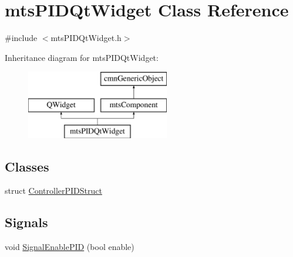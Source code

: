 \hypertarget{classmts_p_i_d_qt_widget}{}\section{mts\+P\+I\+D\+Qt\+Widget Class Reference}
\label{classmts_p_i_d_qt_widget}


{\ttfamily \#include $<$mts\+P\+I\+D\+Qt\+Widget.\+h$>$}

Inheritance diagram for mts\+P\+I\+D\+Qt\+Widget\+:\begin{figure}[H]
\begin{center}
\leavevmode
\includegraphics[height=3.000000cm]{d6/de2/classmts_p_i_d_qt_widget}
\end{center}
\end{figure}
\subsection*{Classes}
\begin{DoxyCompactItemize}
\item 
struct \hyperlink{structmts_p_i_d_qt_widget_1_1_controller_p_i_d_struct}{Controller\+P\+I\+D\+Struct}
\end{DoxyCompactItemize}
\subsection*{Signals}
\begin{DoxyCompactItemize}
\item 
void \hyperlink{classmts_p_i_d_qt_widget_ad9810d6f7a836bebaa16e874c7e9594f}{Signal\+Enable\+P\+I\+D} (bool enable)
\end{DoxyCompactItemize}
